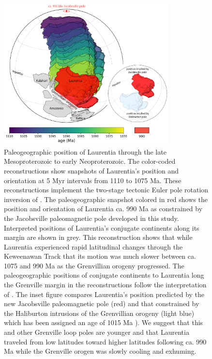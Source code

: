 \begin{figure}[h!]
\centering
\includegraphics[width=0.8\textwidth]{figure/Zhang2024a/Jacobsville_paleogeography.pdf}
\caption{Paleogeographic position of Laurentia through the late Mesoproterozoic to early Neoproterozoic. The color-coded reconstructions show snapshots of Laurentia's position and orientation at 5 Myr intervals from 1110 to 1075 Ma. These reconstructions implement the two-stage tectonic Euler pole rotation inversion of \cite{Swanson-Hysell2019a}. The paleogeographic snapshot colored in red shows the position and orientation of Laurentia ca. 990 Ma as constrained by the Jacobsville paleomagnetic pole developed in this study. Interpreted positions of Laurentia's conjugate continents along its margin are shown in grey. This reconstruction shows that while Laurentia experienced rapid latitudinal changes through the Keweenawan Track that its motion was much slower between ca. 1075 and 990 Ma as the Grenvillian orogeny progressed. The paleogeographic positions of conjugate continents to Laurentia long the Grenville margin in the reconstructions follow the interpretation of \cite{Swanson-Hysell2023a}. The inset figure compares Laurentia's position predicted by the new Jacobsville paleomagnetic pole (red) and that constrained by the Haliburton intrusions of the Grenvillian orogeny (light blue) which has been assigned an age of 1015 Ma \citep{Warnock2000a}). We suggest that this and other Grenville loop poles are younger and that Laurentia traveled from low latitudes toward higher latitudes following ca. 990 Ma while the Grenville orogen was slowly cooling and exhuming.}
\label{fig:paleogeography}
\end{figure}

